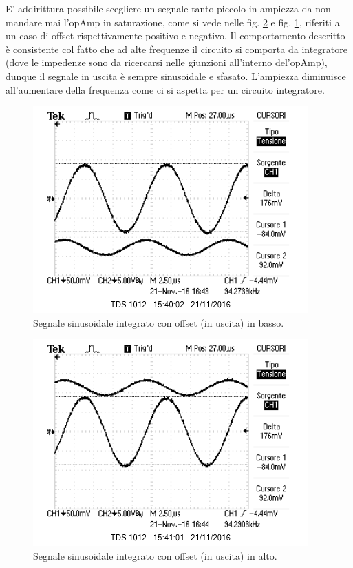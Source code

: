 \documentclass[10pt,a4paper]{article}
\begin{document}
E' addirittura possibile scegliere un segnale tanto piccolo in ampiezza da non mandare mai l'opAmp in saturazione, come si vede nelle fig. \ref{senoAlto} e fig. \ref{senoBasso}, riferiti a un caso di offset rispettivamente positivo e negativo.
Il comportamento descritto è consistente col fatto che ad alte frequenze il circuito si comporta da integratore (dove le impedenze sono da ricercarsi nelle giunzioni all'interno del'opAmp), dunque il segnale in uscita è sempre sinusoidale e sfasato. L'ampiezza diminuisce all'aumentare della frequenza come ci si aspetta per un circuito integratore. 

\begin{figure}[htb!]
\centering
\includegraphics[scale=1.0]{immagini/sinusoidaleinBasso.png}
\caption{Segnale sinusoidale integrato con offset (in uscita) in basso.}
\label{senoBasso}
\end{figure}

\begin{figure}[htb!]
\centering
\includegraphics[scale=1.0]{immagini/sinusoidaleinAlto.png}
\caption{Segnale sinusoidale integrato con offset (in uscita) in alto.}
\label{senoAlto}
\end{figure}
\end{document}
